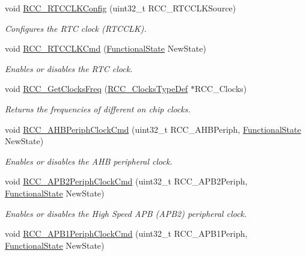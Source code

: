 \begin{DoxyCompactItemize}
void \hyperlink{group___r_c_c___exported___functions_ga1473d8a5a020642966359611c44181b0}{R\+C\+C\+\_\+\+R\+T\+C\+C\+L\+K\+Config} (uint32\+\_\+t R\+C\+C\+\_\+\+R\+T\+C\+C\+L\+K\+Source)
\begin{DoxyCompactList}\small\item\em Configures the R\+TC clock (R\+T\+C\+C\+LK). \end{DoxyCompactList}\item 
void \hyperlink{group___r_c_c___exported___functions_ga9802f84846df2cea8e369234ed13b159}{R\+C\+C\+\_\+\+R\+T\+C\+C\+L\+K\+Cmd} (\hyperlink{group___exported__types_gac9a7e9a35d2513ec15c3b537aaa4fba1}{Functional\+State} New\+State)
\begin{DoxyCompactList}\small\item\em Enables or disables the R\+TC clock. \end{DoxyCompactList}\item 
void \hyperlink{group___r_c_c___exported___functions_ga3e9944fd1ed734275222bbb3e3f29993}{R\+C\+C\+\_\+\+Get\+Clocks\+Freq} (\hyperlink{struct_r_c_c___clocks_type_def}{R\+C\+C\+\_\+\+Clocks\+Type\+Def} $\ast$R\+C\+C\+\_\+\+Clocks)
\begin{DoxyCompactList}\small\item\em Returns the frequencies of different on chip clocks. \end{DoxyCompactList}\item 
void \hyperlink{group___r_c_c___exported___functions_gae0b30d8598b8393bdba9c3fefba3a968}{R\+C\+C\+\_\+\+A\+H\+B\+Periph\+Clock\+Cmd} (uint32\+\_\+t R\+C\+C\+\_\+\+A\+H\+B\+Periph, \hyperlink{group___exported__types_gac9a7e9a35d2513ec15c3b537aaa4fba1}{Functional\+State} New\+State)
\begin{DoxyCompactList}\small\item\em Enables or disables the A\+HB peripheral clock. \end{DoxyCompactList}\item 
void \hyperlink{group___r_c_c___exported___functions_ga56ff55caf8d835351916b40dd030bc87}{R\+C\+C\+\_\+\+A\+P\+B2\+Periph\+Clock\+Cmd} (uint32\+\_\+t R\+C\+C\+\_\+\+A\+P\+B2\+Periph, \hyperlink{group___exported__types_gac9a7e9a35d2513ec15c3b537aaa4fba1}{Functional\+State} New\+State)
\begin{DoxyCompactList}\small\item\em Enables or disables the High Speed A\+PB (A\+P\+B2) peripheral clock. \end{DoxyCompactList}\item 
void \hyperlink{group___r_c_c___exported___functions_gaee7cc5d73af7fe1986fceff8afd3973e}{R\+C\+C\+\_\+\+A\+P\+B1\+Periph\+Clock\+Cmd} (uint32\+\_\+t R\+C\+C\+\_\+\+A\+P\+B1\+Periph, \hyperlink{group___exported__types_gac9a7e9a35d2513ec15c3b537aaa4fba1}{Functional\+State} New\+State)

\end{DoxyCompactItemize}
